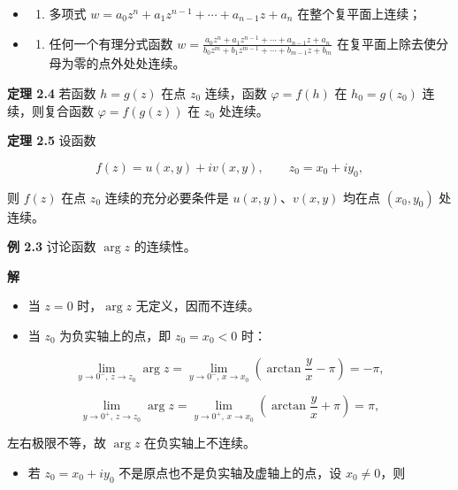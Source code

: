 \begin{itemize}
\tightlist
\item
  \begin{enumerate}
  \def\labelenumi{(\arabic{enumi})}
  \tightlist
  \item
    多项式 \(\displaystyle w=a_0z^n+a_1z^{n-1}+\cdots+a_{n-1}z+a_n\)
    在整个复平面上连续；
  \end{enumerate}
\item
  \begin{enumerate}
  \def\labelenumi{(\arabic{enumi})}
  \setcounter{enumi}{1}
  \tightlist
  \item
    任何一个有理分式函数
    \(\displaystyle w=\frac{a_0z^n+a_1z^{n-1}+\cdots+a_{n-1}z+a_n}{b_0z^m+b_1z^{m-1}+\cdots+b_{m-1}z+b_m}\)
    在复平面上除去使分母为零的点外处处连续。
  \end{enumerate}
\end{itemize}

\textbf{定理 2.4} 若函数 \(h=g(z)\) 在点 \(z_0\) 连续，函数
\(\varphi=f(h)\) 在 \(h_0=g(z_0)\) 连续，则复合函数 \(\varphi=f(g(z))\)
在 \(z_0\) 处连续。

\textbf{定理 2.5} 设函数

\[
f(z)=u(x,y)+iv(x,y),\qquad z_0=x_0+iy_0,
\]

则 \(f(z)\) 在点 \(z_0\) 连续的充分必要条件是 \(u(x,y)\)、\(v(x,y)\)
均在点 \((x_0,y_0)\) 处连续。

\textbf{例 2.3} 讨论函数 \(\arg z\) 的连续性。

\textbf{解}

\begin{itemize}
\tightlist
\item
  当 \(z=0\) 时，\(\arg z\) 无定义，因而不连续。
\item
  当 \(z_0\) 为负实轴上的点，即 \(z_0=x_0<0\) 时：
\end{itemize}

\[
\lim_{y\to0^-,\,z\to z_0}\arg z=\lim_{y\to0^-,\,x\to x_0}\left(\arctan\frac{y}{x}-\pi\right)=-\pi,
\]

\[
\lim_{y\to0^+,\,z\to z_0}\arg z=\lim_{y\to0^+,\,x\to x_0}\left(\arctan\frac{y}{x}+\pi\right)=\pi,
\]

左右极限不等，故 \(\arg z\) 在负实轴上不连续。

\begin{itemize}
\tightlist
\item
  若 \(z_0=x_0+iy_0\) 不是原点也不是负实轴及虚轴上的点，设
  \(x_0\neq 0\)，则
\end{itemize}

